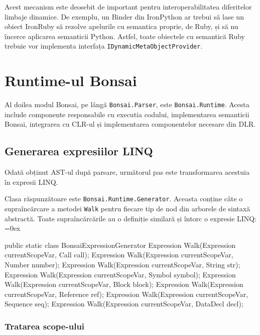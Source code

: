 \documentclass[12pt,a4paper]{memoir}
\renewcommand{\c}{\texttt}
\newenvironment{code}
{
\definecolor{shadecolor}{gray}{0.91}
\topsep=0ex
\relax
\shaded
\verbatim
}
{
\endverbatim
\endshaded
}
\begin{document}
Acest mecanism este deosebit de important pentru interoperabilitatea diferitelor limbaje dinamice. De exemplu, un Binder din IronPython ar trebui să lase un obiect IronRuby să rezolve apelurile cu semantica proprie, de Ruby, și să nu încerce aplicarea semanticii Python. Astfel, toate obiectele cu semantică Ruby trebuie vor implementa interfața \c{IDynamicMetaObjectProvider}.

\chapter{Runtime-ul Bonsai}

Al doilea modul Bonsai, pe lângă \c{Bonsai.Parser}, este \c{Bonsai.Runtime}. Acesta include componente responsabile cu executia codului, implementarea semanticii Bonsai, integrarea cu CLR-ul și implementarea componentelor necesare din DLR.

\section{Generarea expresiilor LINQ}

Odată obținut AST-ul după parsare, următorul pas este transformarea acestuia în expresii LINQ\cite{linq_expressions}. 

Clasa răspunzătoare este \c{Bonsai.Runtime.Generator}. Aceasta conține câte o supraîncărcare a metodei \c{Walk} pentru fiecare tip de nod din arborele de sintaxă abstractă. Toate supraîncărcările au o definiție similară și întorc o expresie LINQ:
\begin{code}
public static class BonsaiExpressionGenerator {
  Expression Walk(Expression currentScopeVar, Call call);       
  Expression Walk(Expression currentScopeVar, Number number);
  Expression Walk(Expression currentScopeVar, String str);
  Expression Walk(Expression currentScopeVar, Symbol symbol);
  Expression Walk(Expression currentScopeVar, Block block);
  Expression Walk(Expression currentScopeVar, Reference ref);
  Expression Walk(Expression currentScopeVar, Sequence seq);
  Expression Walk(Expression currentScopeVar, DataDecl decl);
}
\end{code}

\subsection{Tratarea scope-ului}\label{sec:ScopeManagement}
\end{document}
